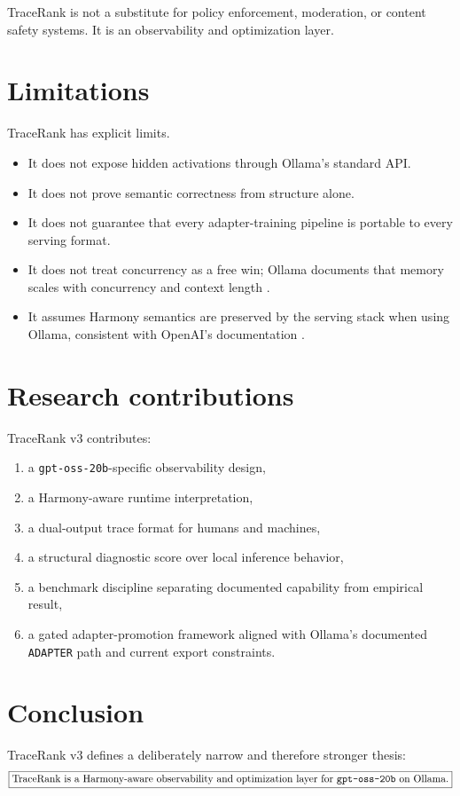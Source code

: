     TraceRank is not a substitute for policy enforcement, moderation, or content safety systems. It is an observability and optimization layer.
    
    \section{Limitations}
    TraceRank has explicit limits.
    \begin{itemize}
      \item It does not expose hidden activations through Ollama's standard API.
      \item It does not prove semantic correctness from structure alone.
      \item It does not guarantee that every adapter-training pipeline is portable to every serving format.
      \item It does not treat concurrency as a free win; Ollama documents that memory scales with concurrency and context length \cite{ollama_faq}.
      \item It assumes Harmony semantics are preserved by the serving stack when using Ollama, consistent with OpenAI's documentation \cite{openai_harmony,openai_ollama_guide}.
    \end{itemize}
    
    \section{Research contributions}
    TraceRank v3 contributes:
    \begin{enumerate}[label=\arabic*.]
      \item a \texttt{gpt-oss-20b}-specific observability design,
      \item a Harmony-aware runtime interpretation,
      \item a dual-output trace format for humans and machines,
      \item a structural diagnostic score over local inference behavior,
      \item a benchmark discipline separating documented capability from empirical result,
      \item a gated adapter-promotion framework aligned with Ollama's documented \texttt{ADAPTER} path and current export constraints.
    \end{enumerate}
    
    \section{Conclusion}
    TraceRank v3 defines a deliberately narrow and therefore stronger thesis:
    \begin{equation}
    \boxed{\text{TraceRank is a Harmony-aware observability and optimization layer for \texttt{gpt-oss-20b} on Ollama.}}
    \end{equation}
    
